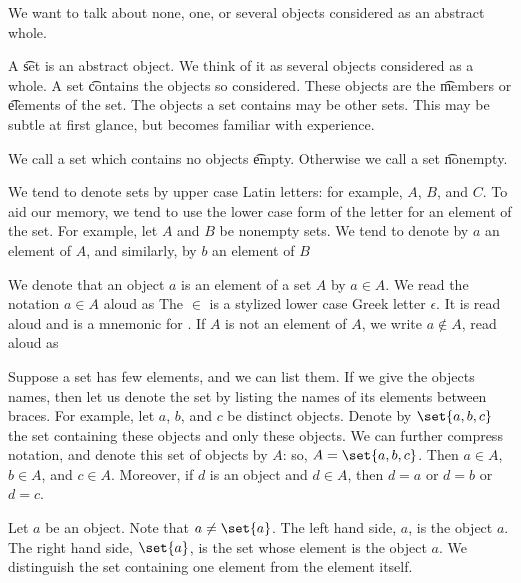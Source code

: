 

We want to talk about none, one, or several objects considered as an abstract whole.


A \t{set} is an abstract object. 
We think of it as several objects considered as a whole.
A set \t{contains} the objects so considered.
These objects are the \t{members} or \t{elements} of the set.
The objects a set contains may be other sets.
This may be subtle at first glance, but becomes familiar with experience.

We call a set which contains no objects \t{empty}.
Otherwise we call a set \t{nonempty}.



We tend to denote sets by upper case Latin letters: for example, $A$, $B$, and $C$.
To aid our memory, we tend to use the lower case form of the letter for an element of the set.
For example, let $A$ and $B$ be nonempty sets.
We tend to denote by $a$ an element of $A$, and similarly, by $b$ an element of $B$

We denote that an object $a$ is an element of a set $A$ by $a \in A$.
We read the notation $a \in A$ aloud as 
The $\in$ is a stylized lower case Greek letter $\epsilon$.
It is read aloud  and is a mnemonic for .
If $A$ is not an element of $A$, we write $a \not\in A$, read aloud as 

Suppose a set has few elements, and we can list them.
If we give the objects names, then let us denote the set by listing the names of its elements between braces.
For example, let $a$, $b$, and $c$ be distinct objects.
Denote by $\set{a, b, c}$ the set containing these objects and only these objects.
We can further compress notation, and denote this set of objects by $A$: so, $A = \set{a, b, c}$.
Then $a \in A$, $b \in A$, and $c \in A$.
Moreover, if $d$ is an object and $d \in A$, then $d = a$ or $d = b$ or $d = c$.

Let $a$ be an object.
Note that $a \neq \set{a}$.
The left hand side, $a$, is the object $a$.
The right hand side, $\set{a}$, is the set whose element is the object $a$.
We distinguish the set containing one element from the element itself.


